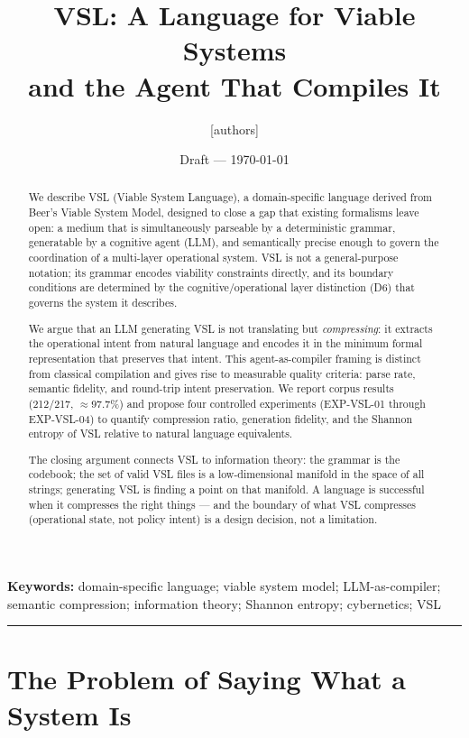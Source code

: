 \documentclass[12pt]{article}
\title{VSL: A Language for Viable Systems\\
\large and the Agent That Compiles It}
\author{[authors]}
\date{Draft — \today}
\begin{document}
\maketitle

\begin{abstract}
We describe VSL (Viable System Language), a domain-specific language derived from
Beer's Viable System Model, designed to close a gap that existing formalisms leave
open: a medium that is simultaneously parseable by a deterministic grammar, generatable
by a cognitive agent (LLM), and semantically precise enough to govern the coordination
of a multi-layer operational system. VSL is not a general-purpose notation; its grammar
encodes viability constraints directly, and its boundary conditions are determined by
the cognitive/operational layer distinction (D6) that governs the system it describes.

We argue that an LLM generating VSL is not translating but \emph{compressing}: it
extracts the operational intent from natural language and encodes it in the minimum
formal representation that preserves that intent. This agent-as-compiler framing is
distinct from classical compilation and gives rise to measurable quality criteria:
parse rate, semantic fidelity, and round-trip intent preservation. We report corpus
results (212/217, $\approx$97.7\%) and propose four controlled experiments (EXP-VSL-01
through EXP-VSL-04) to quantify compression ratio, generation fidelity, and the
Shannon entropy of VSL relative to natural language equivalents.

The closing argument connects VSL to information theory: the grammar is the codebook;
the set of valid VSL files is a low-dimensional manifold in the space of all strings;
generating VSL is finding a point on that manifold. A language is successful when it
compresses the right things — and the boundary of what VSL compresses (operational
state, not policy intent) is a design decision, not a limitation.
\end{abstract}

\textbf{Keywords:} domain-specific language; viable system model; LLM-as-compiler;
semantic compression; information theory; Shannon entropy; cybernetics; VSL

\bigskip\hrule\bigskip

\section{The Problem of Saying What a System Is}
\label{sec:origin}
\end{document}
